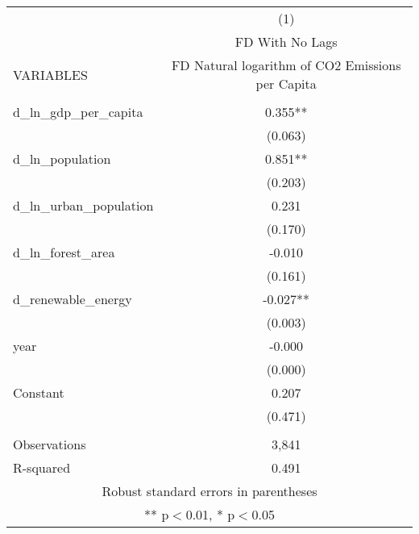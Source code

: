 \begin{tabular}{lc} \hline
 & (1) \\
 & FD With No Lags \\
VARIABLES & FD Natural logarithm of CO2 Emissions per Capita \\ \hline
 &  \\
d\_ln\_gdp\_per\_capita & 0.355** \\
 & (0.063) \\
d\_ln\_population & 0.851** \\
 & (0.203) \\
d\_ln\_urban\_population & 0.231 \\
 & (0.170) \\
d\_ln\_forest\_area & -0.010 \\
 & (0.161) \\
d\_renewable\_energy & -0.027** \\
 & (0.003) \\
year & -0.000 \\
 & (0.000) \\
Constant & 0.207 \\
 & (0.471) \\
 &  \\
Observations & 3,841 \\
 R-squared & 0.491 \\ \hline
\multicolumn{2}{c}{ Robust standard errors in parentheses} \\
\multicolumn{2}{c}{ ** p$<$0.01, * p$<$0.05} \\
\end{tabular}
